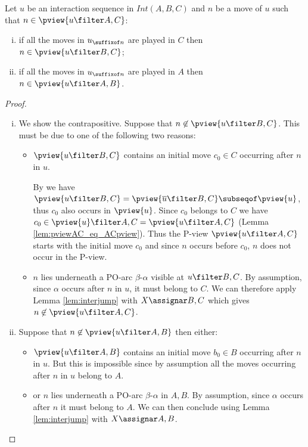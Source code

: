 \begin{lemma}
\label{lem:in_pviewAC_imp_in_pviewX}
Let $u$ be an interaction sequence in $Int(A,B,C)$ and
$n$ be a move of $u$ such that $n\in\pview{u \filter A,C}$:
\begin{enumerate}[i.]
\item
if all the moves in $u_{\suffixof n}$
are played in $C$  then $n \in \pview{u \filter B,C}$;
\item
if all the moves in $u_{\suffixof n}$ are played in $A$ then $n \in \pview{u \filter A,B}$.
\end{enumerate}
\end{lemma}
\begin{proof}
\begin{enumerate}[(i)]
\item
We show the contrapositive. Suppose that $n \not\in\pview{u \filter B,C}$. This must be due to one of the following  two
reasons:
\begin{itemize}[-]
\item $\pview{u \filter B,C}$ contains an initial move $c_0 \in C$
occurring after $n$ in $u$.


By \cite[Lemma 3.3.1]{Harmer2005}
we have $\pview{u \filter B,C} = \pview{\overline{u} \filter B,C} \subseqof \pview{u}$, thus $c_0$ also occurs in $\pview{u}$.
Since $c_0$ belongs to $C$ we have
$c_0 \in \pview{u} \filter A,C=
\pview{u \filter A,C}$ (Lemma \ref{lem:pviewAC_eq_ACpview}).
Thus the P-view $\pview{u \filter A,C}$
starts with the initial move $c_0$ and
since $n$ occurs before $c_0$, $n$ does not occur in the P-view.

\item $n$ lies underneath a PO-arc $\beta$-$\alpha$ visible
at $ u \filter B,C$.
By assumption, since $\alpha$ occurs after $n$ in $u$, it must belong to $C$. We can therefore apply Lemma \ref{lem:interjump}
with $X\assignar B,C$ which gives
$n \not\in\pview{u \filter A,C}$.
\end{itemize}

\item Suppose that $n \not\in\pview{u \filter A,B}$ then either:
\begin{itemize}[-]
\item $\pview{u \filter A,B}$ contains an initial move $b_0 \in B$
occurring after $n$ in $u$. But this is impossible since by assumption all the moves occurring after $n$ in $u$ belong to $A$.

\item or $n$ lies underneath a PO-arc $\beta$-$\alpha$ in $A,B$.
By assumption, since $\alpha$ occurs after $n$ it must belong to $A$. We can then conclude using
Lemma \ref{lem:interjump} with $X\assignar A,B$.
\end{itemize}
\end{enumerate}
\end{proof}

